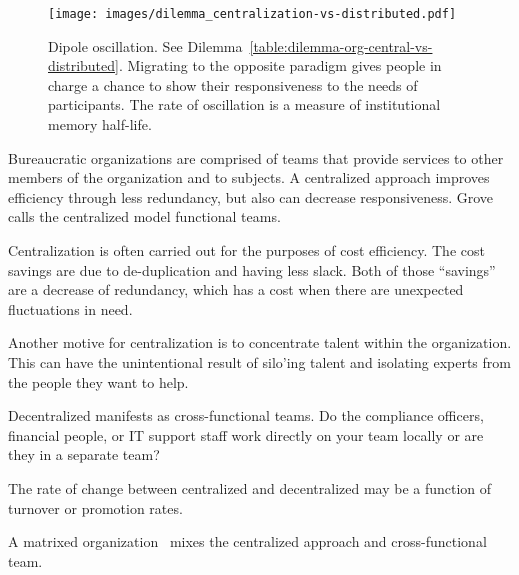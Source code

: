 \begin{figure}[H] %
    \centering
    \texttt{[image: images/dilemma\_centralization-vs-distributed.pdf]}
    \caption{Dipole oscillation. See Dilemma~\ref{table:dilemma-org-central-vs-distributed}. Migrating to the opposite paradigm gives people in charge a chance to show their responsiveness to the needs of participants. The rate of oscillation is a measure of institutional memory half-life.}
    \label{fig:central-vs-distributed}
\end{figure}

Bureaucratic organizations are comprised of teams that provide services to other members of the organization and to subjects. A centralized approach improves efficiency through less redundancy, but also can decrease responsiveness.  
Grove~\cite{1995_Grove} calls the centralized model functional teams.


Centralization is often carried out for the purposes of cost efficiency. The cost savings are due to de-duplication and having less slack. Both of those ``savings'' are a decrease of redundancy, which has a cost when there are unexpected fluctuations in need. 

Another motive for centralization is to concentrate talent within the organization. This can have the unintentional result of silo'ing talent and isolating experts from the people they want to help.

Decentralized manifests as cross-functional teams. Do the compliance officers, financial people, or IT support staff work directly on your team locally or are they in a separate team?

The rate of change between centralized and decentralized may be a function of turnover or promotion rates. 

A matrixed organization~\cite{1985_NASA} mixes the centralized approach and cross-functional team.



